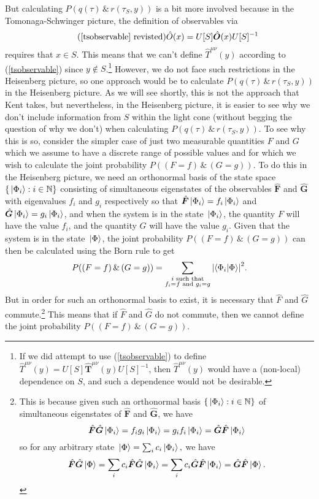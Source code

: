  But calculating $P(q(\tau) \, \&\,  r(\tau_S,y))$ is a bit more involved because in the Tomonaga-Schwinger picture, the definition of observables via 
 \begin{equation}\tag{\ref{tsobservable} revisted}
  \hat{O}(x)=U[S]\hat{\bm{O}}(x)U[S]^{-1}
\end{equation}
requires that $x\in S$.
This means that we can't define $\hat{T}^{\mu\nu}(y)$ according to (\ref{tsobservable}) since $y\not\in S$.\footnote{If we did attempt to use (\ref{tsobservable}) to define $\hat{T}^{\mu\nu}(y)=U[S]\hat{\bm{T}}^{{\mu\nu}}(y)U[S]^{-1}$, then $\hat{T}^{\mu\nu}(y)$ would have a (non-local) dependence on $S$, and such a dependence would not be desirable.} However, we do not face such restrictions in the Heisenberg picture, so one approach would be to calculate $P(q(\tau) \, \&\,  r(\tau_S,y))$ in the Heisenberg picture. As we will see shortly, this is not the approach that Kent takes, but nevertheless, in the Heisenberg picture, it is easier to see why we don't include information from $S$ within the light cone (without begging the question of why we don't) when calculating $P(q(\tau) \, \&\,  r(\tau_S,y))$. To see why this is so, consider the simpler case of just two measurable quantities ${F}$ and ${G}$ which we assume to have a discrete range of possible values and for which we wish to calculate the joint probability $P((F=f)\, \&\, (G=g))$. To do this in the Heisenberg picture, we need an orthonormal basis of the state space $\{\ket*{\Phi_{i}}:i\in\mathbb{N}\}$ consisting of simultaneous eigenstates of the observables $\hat{\bm{F}}$ and $\hat{\bm{G}}$ with eigenvalues $f_{i}$ and $g_{i}$ respectively so that $\hat{\bm{F}}\ket*{\Phi_{i}}=f_{i}\ket*{\Phi_{i}}$ and $\hat{\bm{G}}\ket*{\Phi_{i}}=g_{i}\ket*{\Phi_{i}}$, and when the system is in the state $\ket*{\Phi_{i}}$, the quantity $F$ will have the value $f_{i}$, and the quantity $G$ will have the value $g_{i}$. Given that the system is in the state $\ket*{\Phi}$, the joint probability $P((F=f)\, \&\, (G=g))$ can then be calculated using the Born rule to get
$$P((F=f)\, \&\, (G=g))=\sum_{\substack{i \text{ such that} \\ f_{i}=f \text{ and } g_{i}=g}}\abs{\ip{\Phi_{i}}{\Phi}}^2.$$
But  in order for such an orthonormal basis to exist, it is necessary that $\hat{F}$ and $\hat{G}$ commute.\footnote{This is because given such an orthonormal basis $\{\ket*{\Phi_{i}}:i\in\mathbb{N}\}$ of simultaneous eigenstates of $\hat{\bm{F}}$ and $\hat{\bm{G}}$, we have 
$$\hat{\bm{F}}\hat{\bm{G}}\ket*{\Phi_{i}}=f_{i}g_{i}\ket*{\Phi_{i}}=g_{i}f_{i}\ket*{\Phi_{i}}=\hat{\bm{G}}\hat{\bm{F}}\ket*{\Phi_{i}}$$ so for any arbitrary state $\ket*{\Phi}=\sum_i c_i \ket*{\Phi_{i}},$ we have 
$$\hat{\bm{F}}\hat{\bm{G}}\ket*{\Phi}=\sum_i c_i \hat{\bm{F}}\hat{\bm{G}}\ket*{\Phi_{i}}= \sum_i c_i \hat{\bm{G}}\hat{\bm{F}}\ket*{\Phi_{i}}=\hat{\bm{G}}\hat{\bm{F}}\ket*{\Phi}.$$ 
} This means that if $\hat{F}$ and $\hat{G}$ do not commute, then we cannot define the joint probability $P((F=f)\, \&\, (G=g)).$

